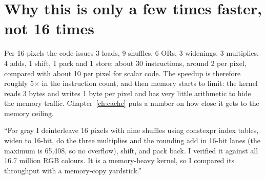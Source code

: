 \section{Why this is only a few times faster, not 16 times}

Per 16 pixels the code issues 3 loads, 9 shuffles, 6 ORs, 3 widenings, 3 multiplies, 4 adds, 1 shift, 1 pack and 1 store: about 30 instructions, around 2 per pixel, compared with about 10 per pixel for scalar code. The speedup is therefore roughly 5$\times$ in the instruction count, and then memory starts to limit: the kernel reads 3 bytes and writes 1 byte per pixel and has very little arithmetic to hide the memory traffic. Chapter~\ref{ch:cache} puts a number on how close it gets to the memory ceiling.

\begin{sound}
``For gray I deinterleave 16 pixels with nine  shuffles using constexpr index tables, widen to 16-bit, do the three multiplies and the rounding add in 16-bit lanes (the maximum is 65{,}408, so no overflow), shift, and pack back. I verified it against all 16.7 million RGB colours. It is a memory-heavy kernel, so I compared its throughput with a memory-copy yardstick.''
\end{sound}

